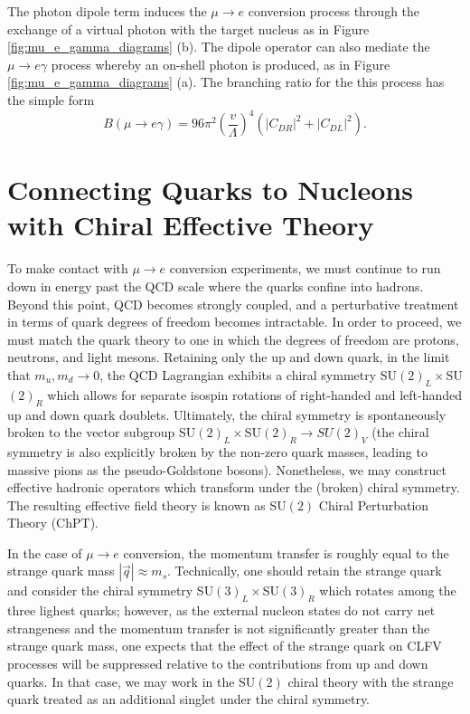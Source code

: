 \documentclass{book}[letterpaper,12pt]
\begin{document}
The photon dipole term induces the $\mu\rightarrow e$ conversion process through the exchange of a virtual photon with the target nucleus as in Figure \ref{fig:mu_e_gamma_diagrams} (b). The dipole operator can also mediate the $\mu\rightarrow e\gamma$ process whereby an on-shell photon is produced, as in Figure \ref{fig:mu_e_gamma_diagrams} (a). The branching ratio for the this process has the simple form 
\begin{equation}
B(\mu\rightarrow e\gamma)=96\pi^2\left(\frac{v}{\Lambda}\right)^4\left(|C_{DR}|^2+|C_{DL}|^2\right).
\end{equation} 
\section{Connecting Quarks to Nucleons with Chiral Effective Theory}
\label{sec:quarks_2_nucleons}
To make contact with $\mu\rightarrow e$ conversion experiments, we must continue to run down in energy past the QCD scale where the quarks confine into hadrons. Beyond this point, QCD becomes strongly coupled, and a perturbative treatment in terms of quark degrees of freedom becomes intractable. In order to proceed, we must match the quark theory to one in which the degrees of freedom are protons, neutrons, and light mesons. Retaining only the up and down quark, in the limit that $m_u,m_d\rightarrow 0$, the QCD Lagrangian exhibits a chiral symmetry SU$(2)_L\times$SU$(2)_R$ which allows for separate isospin rotations of right-handed and left-handed up and down quark doublets. Ultimately, the chiral symmetry is spontaneously broken to the vector subgroup SU$(2)_L\times$SU$(2)_R\rightarrow SU(2)_V$ (the chiral symmetry is also explicitly broken by the non-zero quark masses, leading to massive pions as the pseudo-Goldstone bosons). Nonetheless, we may construct effective hadronic operators which transform under the (broken) chiral symmetry. The resulting effective field theory is known as SU$(2)$ Chiral Perturbation Theory (ChPT).

In the case of $\mu\rightarrow e$ conversion, the momentum transfer is roughly equal to the strange quark mass $|\vec{q}|\approx m_s$. Technically, one should retain the strange quark and consider the  chiral symmetry SU$(3)_L\times$SU$(3)_R$ which rotates among the three lighest quarks; however, as the external nucleon states do not carry net strangeness and the momentum transfer is not significantly greater than the strange quark mass, one expects that the effect of the strange quark on CLFV processes will be suppressed relative to the contributions from up and down quarks. In that case, we may work in the SU$(2)$ chiral theory with the strange quark treated as an additional singlet under the chiral symmetry.
\end{document}
